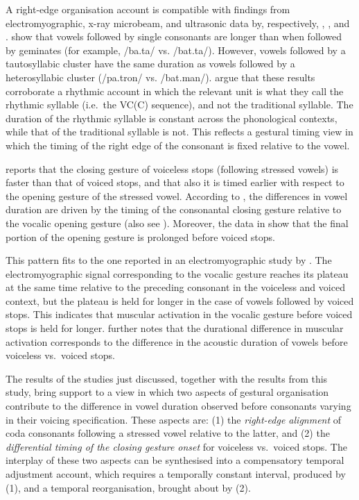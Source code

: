 \documentclass[preprint]{JASAnew}
\begin{document}
A right-edge organisation account is compatible with findings from
electromyographic, x-ray microbeam, and ultrasonic data by,
respectively, \citet{raphael1975}, \citet{de-jong1991}, and
\citet{celata2018}. \citet{celata2018} show that vowels followed by
single consonants are longer than when followed by geminates (for
example, /ba.ta/ vs. /bat.ta/). However, vowels followed by a
tautosyllabic cluster have the same duration as vowels followed by a
heterosyllabic cluster (/pa.tron/ vs. /bat.man/). \citet{celata2018}
argue that these results corroborate a rhythmic account in which the
relevant unit is what they call the rhythmic syllable (i.e.~the VC(C)
sequence), and not the traditional syllable. The duration of the
rhythmic syllable is constant across the phonological contexts, while
that of the traditional syllable is not. This reflects a gestural timing
view in which the timing of the right edge of the consonant is fixed
relative to the vowel.

\citet{de-jong1991} reports that the closing gesture of voiceless stops
(following stressed vowels) is faster than that of voiced stops, and
that also it is timed earlier with respect to the opening gesture of the
stressed vowel. According to \citet{de-jong1991}, the differences in
vowel duration are driven by the timing of the consonantal closing
gesture relative to the vocalic opening gesture (also see
\citealt{hertrich1997}). Moreover, the data in \citet{de-jong1991} show
that the final portion of the opening gesture is prolonged before voiced
stops.

This pattern fits to the one reported in an electromyographic study by
\citet{raphael1975}. The electromyographic signal corresponding to the
vocalic gesture reaches its plateau at the same time relative to the
preceding consonant in the voiceless and voiced context, but the plateau
is held for longer in the case of vowels followed by voiced stops. This
indicates that muscular activation in the vocalic gesture before voiced
stops is held for longer. \citet{raphael1975} further notes that the
durational difference in muscular activation corresponds to the
difference in the acoustic duration of vowels before voiceless
vs.~voiced stops.

The results of the studies just discussed, together with the results
from this study, bring support to a view in which two aspects of
gestural organisation contribute to the difference in vowel duration
observed before consonants varying in their voicing specification. These
aspects are: (1) the \emph{right-edge alignment} of coda consonants
following a stressed vowel relative to the latter, and (2) the
\emph{differential timing of the closing gesture onset} for voiceless
vs.~voiced stops. The interplay of these two aspects can be synthesised
into a compensatory temporal adjustment account, which requires a
temporally constant interval, produced by (1), and a temporal
reorganisation, brought about by (2).
\end{document}
